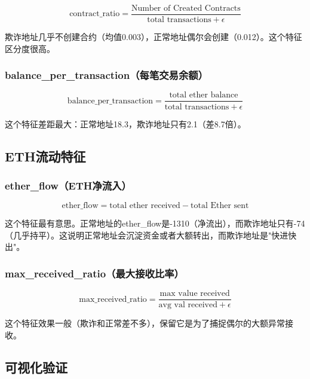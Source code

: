 \documentclass[12pt,a4paper]{article}
\begin{document}
\begin{equation}
\text{contract\_ratio} = \frac{\text{Number of Created Contracts}}{\text{total transactions} + \epsilon}
\end{equation}

欺诈地址几乎不创建合约（均值0.003），正常地址偶尔会创建（0.012）。这个特征区分度很高。

\subsubsection{balance\_per\_transaction（每笔交易余额）}

\begin{equation}
\text{balance\_per\_transaction} = \frac{\text{total ether balance}}{\text{total transactions} + \epsilon}
\end{equation}

这个特征差距最大：正常地址18.3，欺诈地址只有2.1（差8.7倍）。

\subsection{ETH流动特征}

\subsubsection{ether\_flow（ETH净流入）}

\begin{equation}
\text{ether\_flow} = \text{total ether received} - \text{total Ether sent}
\end{equation}

这个特征最有意思。正常地址的ether\_flow是-1310（净流出），而欺诈地址只有-74（几乎持平）。这说明正常地址会沉淀资金或者大额转出，而欺诈地址是"快进快出"。

\subsubsection{max\_received\_ratio（最大接收比率）}

\begin{equation}
\text{max\_received\_ratio} = \frac{\text{max value received}}{\text{avg val received} + \epsilon}
\end{equation}

这个特征效果一般（欺诈和正常差不多），保留它是为了捕捉偶尔的大额异常接收。

\subsection{可视化验证}
\end{document}
